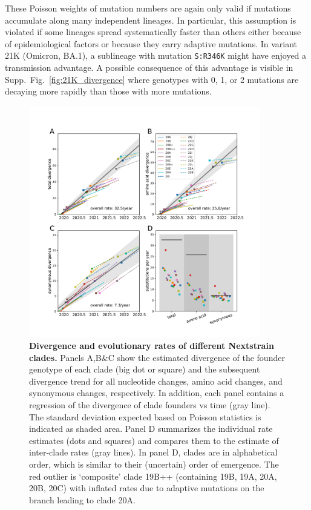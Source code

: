 \documentclass[aps,rmp, twocolumn]{revtex4}
\begin{document}
These Poisson weights of mutation numbers are again only valid if mutations accumulate along many independent lineages.
In particular, this assumption is violated if some lineages spread systematically faster than others either because of epidemiological factors or because they carry adaptive mutations.
In variant 21K (Omicron, BA.1), a sublineage with mutation \texttt{S:R346K} might have enjoyed a transmission advantage.
A possible consequence of this advantage is visible in Supp.~Fig.~\ref{fig:21K_divergence} where genotypes with 0, 1, or 2 mutations are decaying more rapidly than those with more mutations.

\begin{figure}
    \includegraphics[width=0.9\textwidth]{figures/rate_summary.pdf}
    \caption[]{{\bf Divergence and evolutionary rates of different Nextstrain clades.} Panels A,B\&C show the estimated divergence of the founder genotype of each clade (big dot or square) and the subsequent divergence trend for all nucleotide changes, amino acid changes, and synonymous changes, respectively.
    In addition, each panel contains a regression of the divergence of clade founders vs time (gray line).
    The standard deviation expected based on Poisson statistics is indicated as shaded area.
    Panel D summarizes the individual rate estimates (dots and squares) and compares them to the estimate of inter-clade rates (gray lines).
    In panel D, clades are in alphabetical order, which is similar to their (uncertain) order of emergence.
    The red outlier is `composite' clade 19B++ (containing 19B, 19A, 20A, 20B, 20C) with inflated rates due to adaptive mutations on the branch leading to clade 20A.
    \label{fig:rate_summary} }
\end{figure}
\end{document}
